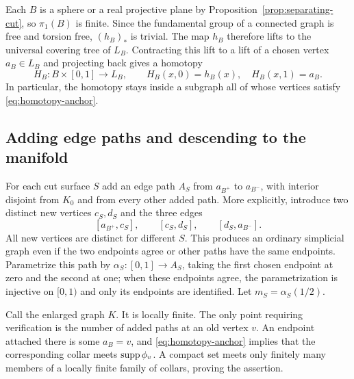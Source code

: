 Each $B$ is a sphere or a real projective plane by
Proposition~\ref{prop:separating-cut}, so $\pi_1(B)$ is finite.
Since the fundamental group of a connected graph is free and
torsion free, $(h_B)_*$ is trivial.  The map $h_B$ therefore
lifts to the universal covering tree of $L_B$.  Contracting
this lift to a lift of a chosen vertex $a_B\in L_B$ and
projecting back gives a homotopy
\begin{equation}
\label{eq:boundary-nullhomotopy}
 H_B:B\times[0,1]\longrightarrow L_B,
 \qquad H_B(x,0)=h_B(x),\quad H_B(x,1)=a_B.
\end{equation}
In particular, the homotopy stays inside a subgraph all of whose
vertices satisfy \eqref{eq:homotopy-anchor}.

\subsection{Adding edge paths and descending to the manifold}

For each cut surface $S$ add an edge path $A_S$ from $a_{B^+}$ to
$a_{B^-}$, with interior disjoint from $K_0$ and from every
other added path.  More explicitly, introduce two distinct new
vertices $c_S,d_S$ and the three edges
\[
 [a_{B^+},c_S],\qquad[c_S,d_S],\qquad[d_S,a_{B^-}].
\]
All new vertices are distinct for different $S$.  This produces
an ordinary simplicial graph even if the two endpoints agree
or other paths have the same endpoints.  Parametrize this path
by $\alpha_S:[0,1]\to A_S$, taking the first chosen endpoint
at zero and the second at one; when these endpoints agree,
the parametrization is injective on $[0,1)$ and only its
endpoints are identified.  Let $m_S=\alpha_S(1/2)$.

Call the enlarged graph $K$.  It is locally finite.  The only
point requiring verification is the number of added paths at
an old vertex $v$.  An endpoint attached there is some
$a_B=v$, and \eqref{eq:homotopy-anchor} implies that the
corresponding collar meets $\operatorname{supp}\phi_v$.  A compact set
meets only finitely many members of a locally finite family
of collars, proving the assertion.


